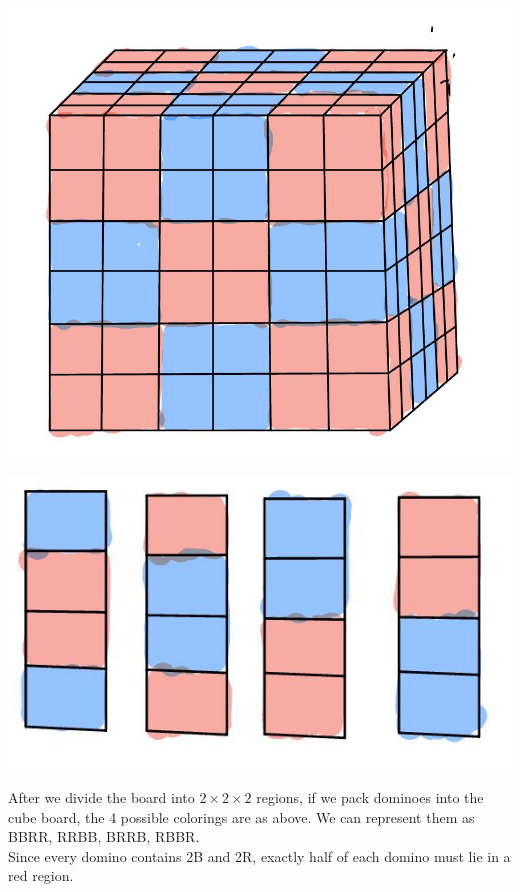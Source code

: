 \documentclass[12pt]{exam}
\begin{document}
\begin{solution}
\begin{qparts}
    \item 
    \begin{center}
        \includegraphics[scale=0.2]{WechatIMG616.jpeg}
    \end{center}
    \begin{center}
        \includegraphics[scale=0.3]{WechatIMG614.jpeg}
    \end{center}
    After we divide the board into $2\times 2\times 2$ regions, if we pack dominoes into the cube board, the 4 possible colorings are as above. We can represent them as BBRR, RRBB, BRRB, RBBR. \\Since every domino contains 2B and 2R, exactly half of each domino must lie in a red region.


\end{qparts}
\end{solution}
\end{document}
